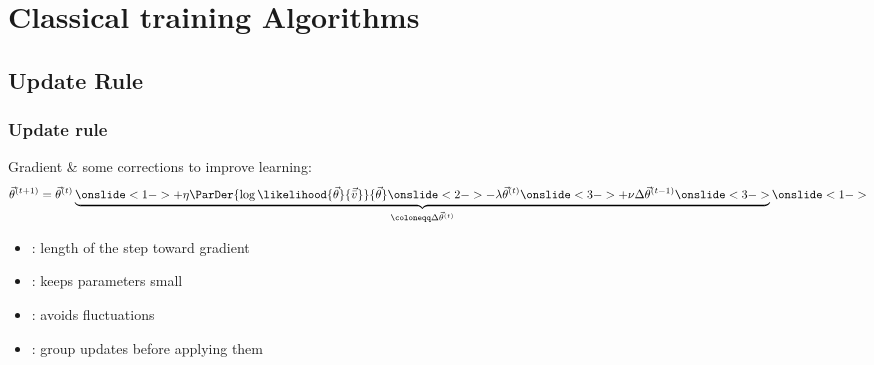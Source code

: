
\section{Classical training Algorithms}
\subsection{Update Rule}
\begin{frame}
  \frametitle{Update rule}
  Gradient \& some corrections to improve learning:
  \[
  \vec{\theta}^{(t+1)} = \vec{\theta}^{(t)}
  \underbrace{
    \onslide<1->{+ \eta \ParDer{\log\likelihood{\vec{\theta}}{\vec{\bar{v}}}}{\vec{\theta}}}
    \onslide<2->{- \lambda \vec{\theta}^{(t)}}
    \onslide<3->{+ \nu \Delta\vec{\theta}^{(t-1)}}
  \onslide<3->}_{{\coloneqq \Delta\vec{\theta}^{(t)}}}
	\onslide<1->
  \]
  \begin{itemize}
    \item<1-> : length of the step toward gradient
    \item<2-> : keeps parameters small
    \item<3-> : avoids fluctuations
    \item<4-> : group updates before applying them 
  \end{itemize}
\end{frame}

